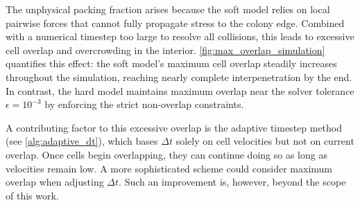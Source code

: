\documentclass[conference]{IEEEtran}
\begin{document}
The unphysical packing fraction arises because the soft model relies on local pairwise forces that cannot fully propagate stress to the colony edge. Combined with a numerical timestep too large to resolve all collisions, this leads to excessive cell overlap and overcrowding in the interior. \autoref{fig:max_overlap_simulation} quantifies this effect: the soft model's maximum cell overlap steadily increases throughout the simulation, reaching nearly complete interpenetration by the end. In contrast, the hard model maintains maximum overlap near the solver tolerance $\epsilon = 10^{-3}$ by enforcing the strict non-overlap constraints.

A contributing factor to this excessive overlap is the adaptive timestep method (see \autoref{alg:adaptive_dt}), which bases $\Delta t$ solely on cell velocities but not on current overlap. Once cells begin overlapping, they can continue doing so as long as velocities remain low. A more sophisticated scheme could consider maximum overlap when adjusting $\Delta t$. Such an improvement is, however, beyond the scope of this work.
\end{document}
